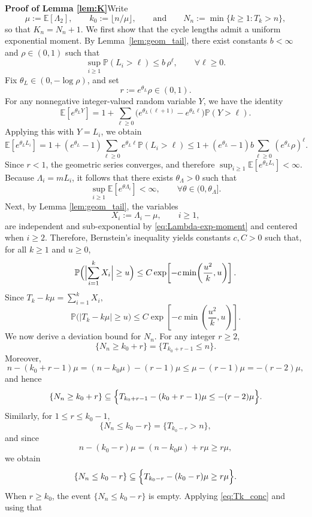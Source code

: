 \documentclass[10pt,a4paper]{amsart}
\renewenvironment{proof}[1]{\par\medskip\noindent\textbf{#1}\enspace\ignorespaces}{\par\medskip}
\def\E{\mathbb{E}}%
\def\P{\mathbb{P}}
\begin{document}
\begin{proof}{Proof of Lemma \ref{lem:K}}Write
\[
\mu:=\E[\Lambda_2],\qquad
k_0:=\lfloor n/\mu\rfloor,
\qquad\text{and}\qquad
N_n:=\min\{k\ge1:T_k>n\},
\]
so that $K_n=N_n+1.$ We first show that the cycle lengths admit a uniform exponential moment.
By Lemma~\ref{lem:geom_tail}, there exist constants \(b<\infty\) and
\(\rho\in(0,1)\) such that
\[
\sup_{i\ge1}\P(L_i>\ell)\le b\,\rho^\ell,
\qquad \forall \ell\ge0.
\]
Fix \(\theta_L\in(0,-\log\rho)\), and set
\[
r:=e^{\theta_L}\rho\in(0,1).
\]
For any nonnegative integer-valued random variable \(Y\), we have the identity
\[
\E[e^{\theta_L Y}]
=
1+\sum_{\ell\ge0}\bigl(e^{\theta_L(\ell+1)}-e^{\theta_L\ell}\bigr)\P(Y>\ell).
\]
Applying this with \(Y=L_i\), we obtain
\[
\E[e^{\theta_L L_i}]
=
1+(e^{\theta_L}-1)\sum_{\ell\ge0}e^{\theta_L\ell}\P(L_i>\ell)
\le
1+(e^{\theta_L}-1)b\sum_{\ell\ge0}(e^{\theta_L}\rho)^\ell.
\]
Since \(r<1\), the geometric series converges, and therefore $\sup_{i\ge1}\E[e^{\theta_L L_i}]<\infty.$ Because \(\Lambda_i=mL_i\), it follows that there exists
\(\theta_\Lambda>0\) such that
\begin{equation}\label{eq:Lambda-exp-moment}
\sup_{i\ge1}\E[e^{\theta \Lambda_i}]<\infty,
\qquad \forall \theta\in(0,\theta_\Lambda].
\end{equation}
Next, by Lemma \ref{lem:geom_tail}, the variables \[ X_i:=\Lambda_i-\mu,\qquad i\ge 1, \] are independent and sub-exponential by \eqref{eq:Lambda-exp-moment} and centered when $i \geq 2$. Therefore, Bernstein's inequality yields constants \(c,C>0\) such that, for all \(k\ge 1\) and \(u\ge0\), \[ \P\Bigl(\Bigl|\sum_{i=1}^{k}X_i\Bigr|\ge u\Bigr) \le C\exp\!\left[-c\min\!\left(\frac{u^2}{k},u\right)\right]. \] Since $T_k-k\mu = \sum_{i=1}^{k}X_i,$ \begin{equation}\label{eq:Tk_conc} \P\bigl(|T_k-k\mu|\ge u\bigr) \le C\exp\!\left[-c\min\!\left(\frac{u^2}{k},u\right)\right]. \end{equation}
We now derive a deviation bound for \(N_n\). For any integer \(r\ge2\),
\[
\{N_n\ge k_0+r\}=\{T_{k_0+r-1}\le n\}.
\]
Moreover,
\[
n-(k_0+r-1)\mu
=
(n-k_0\mu)-(r-1)\mu
\le
\mu-(r-1)\mu
=
-(r-2)\mu,
\]
and hence
\[
\{N_n\ge k_0+r\}
\subseteq
\Bigl\{
T_{k_0+r-1}-(k_0+r-1)\mu\le -(r-2)\mu
\Bigr\}.
\]
Similarly, for \(1\le r\le k_0-1\),
\[
\{N_n\le k_0-r\}=\{T_{k_0-r}>n\},
\]
and since
\[
n-(k_0-r)\mu=(n-k_0\mu)+r\mu\ge r\mu,
\]
we obtain
\[
\{N_n\le k_0-r\}
\subseteq
\Bigl\{
T_{k_0-r}-(k_0-r)\mu\ge r\mu
\Bigr\}.
\]
When \(r\ge k_0\), the event \(\{N_n\le k_0-r\}\) is empty. Applying \eqref{eq:Tk_conc} and using that

\end{proof}
\end{document}
